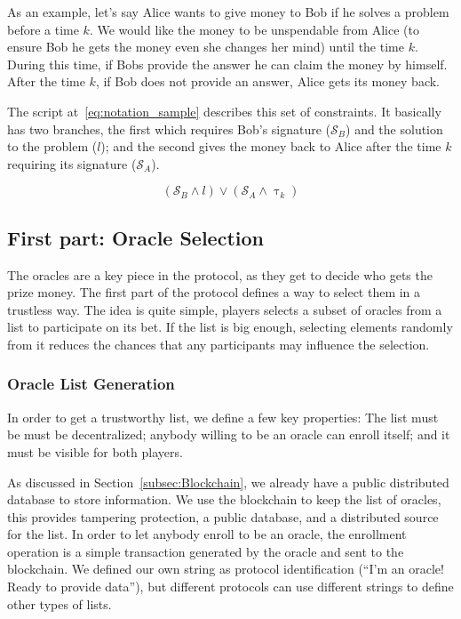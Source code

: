 As an example, let's say Alice wants to give money to Bob if he solves a problem
  before a time $k$.
We would like the money to be unspendable from Alice (to ensure Bob he gets the
  money even she changes her mind) until the time $k$.
During this time, if Bobs provide the answer he can claim the money by himself.
After the time $k$, if Bob does not provide an answer, Alice gets its money
  back.

The script at~\ref{eq:notation_sample} describes this set of constraints.
It basically has two branches, the first which requires Bob's signature
  ($\mathcal{S}_B$) and the solution to the problem ($l$); and the second gives
  the money back to Alice after the time $k$ requiring its signature
  ($\mathcal{S}_A$).

\begin{equation} \label{eq:notation_sample}
    (\mathcal{S}_B \wedge l) \vee (\mathcal{S}_A \wedge \uptau_k)
\end{equation}

\subsection{First part: Oracle Selection}

The oracles are a key piece in the protocol, as they get to decide who gets
  the prize money.
The first part of the protocol defines a way to select them in a trustless
  way.
The idea is quite simple, players selects a subset of oracles from a list
  to participate on its bet.
If the list is big enough, selecting elements randomly from it reduces the
  chances that any participants may influence the selection.

\subsubsection{Oracle List Generation}

In order to get a trustworthy list, we define a few key properties:
The list must be must be decentralized; anybody willing to be an oracle can
  enroll itself; and it must be visible for both players.

As discussed in Section~\ref{subsec:Blockchain}, we already have a public
  distributed database to store information.
We use the blockchain to keep the list of oracles, this provides tampering
  protection, a public database, and a distributed source for the list.
In order to let anybody enroll to be an oracle, the enrollment operation is a
  simple transaction generated by the oracle and sent to the blockchain.
We defined our own string as protocol identification
(``I'm an oracle! Ready to provide data''), but different protocols
  can use different strings to define other types of lists.


